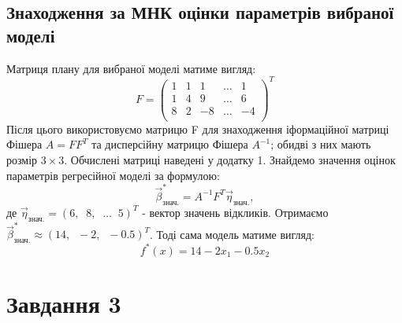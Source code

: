 \documentclass{article}
\begin{document}
    \subsection{Знаходження за МНК оцінки параметрів вибраної моделі}
      Матриця плану для вибраної моделі матиме вигляд:
      \begin{equation}
        F = 
        \begin{pmatrix}
          1 & 1 & 1 & \dots & 1 \\
          1 & 4 & 9 & \dots & 6 \\
          8 & 2 & -8 & \dots & -4 \\
        \end{pmatrix}^T
      \end{equation}
      Після цього використовуємо матрицю F для знаходження іформаційної матриці 
      Фішера $A = FF^T $ та дисперсійну матрицю Фішера $A^{-1}$; обидві з них мають 
      розмір $3 \times 3$.
      Обчислені матриці наведені у додатку 1.
      Знайдемо значення оцінок параметрів регресійної моделі за формулою:
      \begin{equation}
        \vec{\beta}^*_{\text{знач.}} = A^{-1}F^T\vec{\eta}_\text{знач.},
      \end{equation}
      де $\vec{\eta}_\text{знач.} = (6, \;\; 8, \;\; \dots \;\; 5)^T$ - вектор значень 
      відкликів.
      Отримаємо $\vec{\beta}^*_{\text{знач.}} \approx (14, \;\; -2, \;\; -0.5)^T$.
      Тоді сама модель матиме вигляд:
      \begin{equation}
        f^*(x) = 14 - 2 x_1 - 0.5 x_2
      \end{equation}
  \newpage
  \section{Завдання 3}
\end{document}
